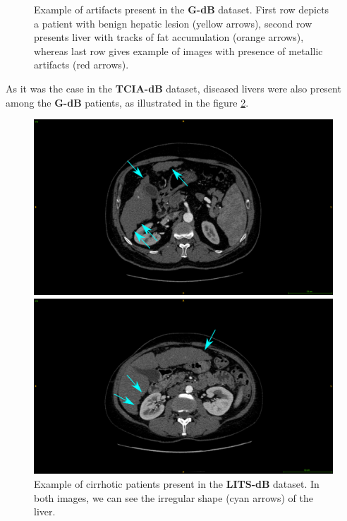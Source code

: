 \documentclass[]{article}
\newcommand{\lmttfont}[1]{{\fontfamily{lmtt}\selectfont #1}}
\begin{document}
\begin{figure}[!ht]
\begin{minipage}{0.45\linewidth}
	\end{minipage}
	\caption{Example of artifacts present in the \textbf{\lmttfont{G-dB}} dataset. First row depicts a patient with benign hepatic lesion (yellow arrows), second row presents liver with tracks of fat accumulation (orange arrows), whereas last row gives example of images with presence of metallic artifacts (red arrows).}
	\label{fig:GDb_artifacts}
\end{figure}
As it was the case in the \textbf{\lmttfont{TCIA-dB}} dataset, diseased livers were also present among the \textbf{\lmttfont{G-dB}} patients, as illustrated in the figure \ref{fig:GDb_diseasedLivers}.
\begin{figure}[!ht]
	\centering
	\begin{minipage}{0.45\linewidth}
		\includegraphics[width=\linewidth]{../Contributions/images/ResizeGDB_cirrhoticPatientArrows}
	\end{minipage} \hspace{-0.1cm}
	\begin{minipage}{0.45\linewidth}
		\includegraphics[width=\linewidth]{../Contributions/images/ResizeGDB_cirrhoticPatientArrows_2}
	\end{minipage}
	\caption{Example of cirrhotic patients present in the \textbf{\lmttfont{LITS-dB}} dataset. In both images, we can see the irregular shape (cyan arrows) of the liver.}
	\label{fig:GDb_diseasedLivers}
\end{figure}
\end{document}
